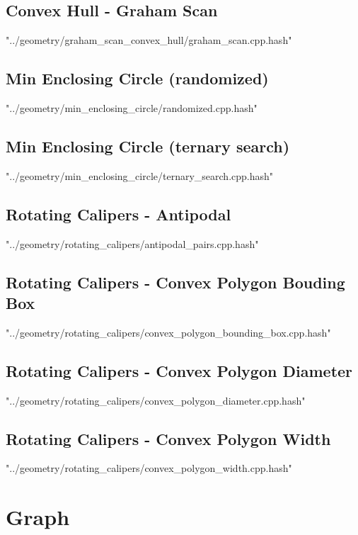 \documentclass [12pt,onecolumn,oneside]{article}
\begin{document}
\subsection{ Convex Hull - Graham Scan}
 {"../geometry/graham_scan_convex_hull/graham_scan.cpp.hash"}
\newpage

\subsection{ Min Enclosing Circle (randomized)}
 {"../geometry/min_enclosing_circle/randomized.cpp.hash"}
\newpage

\subsection{ Min Enclosing Circle (ternary search)}
 {"../geometry/min_enclosing_circle/ternary_search.cpp.hash"}
\newpage

\subsection{ Rotating Calipers - Antipodal}
 {"../geometry/rotating_calipers/antipodal_pairs.cpp.hash"}
\newpage

\subsection{ Rotating Calipers - Convex Polygon Bouding Box}
 {"../geometry/rotating_calipers/convex_polygon_bounding_box.cpp.hash"}
\newpage

\subsection{ Rotating Calipers - Convex Polygon Diameter}
 {"../geometry/rotating_calipers/convex_polygon_diameter.cpp.hash"}
\newpage

\subsection{ Rotating Calipers - Convex Polygon Width}
 {"../geometry/rotating_calipers/convex_polygon_width.cpp.hash"}
\newpage


\section{Graph}
\end{document}

